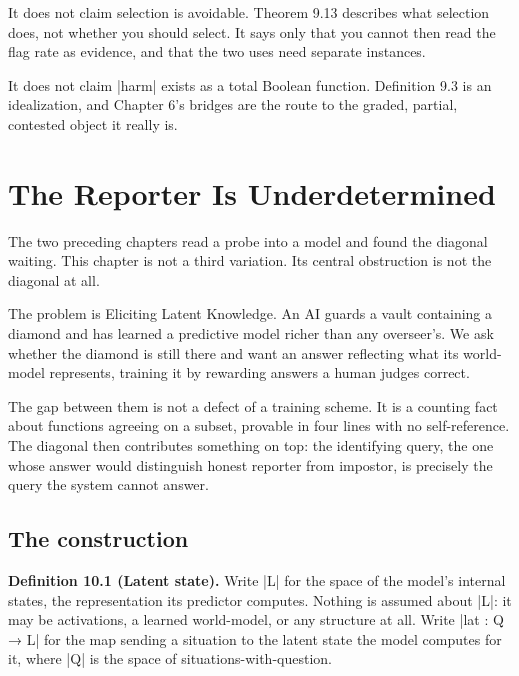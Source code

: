 \documentclass{memoir}
\begin{document}
It does not claim selection is avoidable. Theorem 9.13 describes what selection
does, not whether you should select. It says only that you cannot then read the
flag rate as evidence, and that the two uses need separate instances.

It does not claim \LeanVerb|harm| exists as a total Boolean function. Definition 9.3 is
an idealization, and Chapter 6's bridges are the route to the graded, partial,
contested object it really is.





\chapter{The Reporter Is Underdetermined}\label{Two--Schemas--of--Impossibility-005F-005F-005F--Machine--Checked--Limits--of--Trustworthy--Machine--Learning-005F-005F-005F--and--Why--They--Tighten--with--Capability----The--Reporter--Is--Underdetermined}

The two preceding chapters read a probe into a model and found the diagonal
waiting. This chapter is not a third variation. Its central obstruction is not
the diagonal at all.

The problem is Eliciting Latent Knowledge. An AI guards a vault containing a
diamond and has learned a predictive model richer than any overseer's. We ask
whether the diamond is still there and want an answer reflecting what its
world-model represents, training it by rewarding answers a human judges correct.

The gap between them is not a defect of a training scheme. It is a counting fact
about functions agreeing on a subset, provable in four lines with no
self-reference. The diagonal then contributes something on top: the identifying
query, the one whose answer would distinguish honest reporter from impostor, is
precisely the query the system cannot answer.



\section{The construction}\label{Two--Schemas--of--Impossibility-005F-005F-005F--Machine--Checked--Limits--of--Trustworthy--Machine--Learning-005F-005F-005F--and--Why--They--Tighten--with--Capability----The--Reporter--Is--Underdetermined----The--construction}

\textbf{Definition 10.1 (Latent state).} Write \LeanVerb|L| for the space of the model's
internal states, the representation its predictor computes. Nothing is assumed
about \LeanVerb|L|: it may be activations, a learned world-model, or any structure at
all. Write \LeanVerb|lat : Q → L| for the map sending a situation to the latent state the
model computes for it, where \LeanVerb|Q| is the space of situations-with-question.
\end{document}
